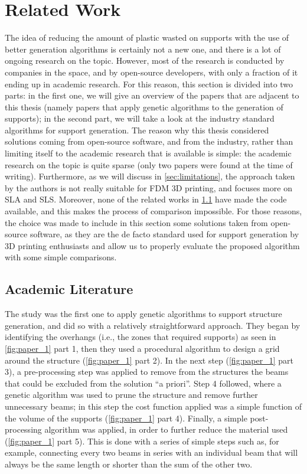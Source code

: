 \chapter{Related Work}
\label{cha:prev_literature}

The idea of reducing the amount of plastic wasted on supports with the use of better
generation algorithms is certainly not a new one, and there is a lot of ongoing
research on the topic. However, most of the research is conducted by companies in
the space, and by open-source developers, with only a fraction of it ending up
in academic research. For this reason, this section is divided into two parts: in the first one, we will give an overview of the papers that are adjacent
to this thesis (namely papers that apply genetic algorithms to the generation
of supports); in the second part, we will take a look at the industry standard
algorithms for support generation.
The reason why this thesis considered solutions coming from open-source software, and
from the industry, rather than limiting itself to the academic research that is available is simple:
the academic research on the topic is quite sparse (only two papers were found at the time of writing).
Furthermore, as we will discuss in \cref{sec:limitations}, the approach taken by the authors is not
really suitable for FDM 3D printing, and focuses more on SLA and SLS. Moreover, none of the related works in \cref{sec:acc_lit}
have made the code available, and this makes the process of comparison impossible.
For those reasons, the choice was made to include in this section some solutions taken from open-source
software, as they are the de facto standard used for support generation by 3D printing enthusiasts and
allow us to properly evaluate the proposed algorithm with some simple comparisons.

\section{Academic Literature}
\label{sec:acc_lit}


The study \cite{VAISSIER201911} was the first one to apply genetic algorithms to support structure generation, and did so with a relatively
straightforward approach. They began by identifying the overhangs (i.e., the zones that required supports)
as seen in \cref{fig:paper_1} part 1, then they used a procedural algorithm to design a grid around the structure
(\cref{fig:paper_1} part 2). In the next step (\cref{fig:paper_1} part 3), a pre-processing step was applied to remove
from the structures the beams that could be excluded from the solution ``a priori''. Step 4 followed, where
a genetic algorithm was used to prune the structure and remove further unnecessary beams; in this step the cost
function applied was a simple function of the volume of the supports (\cref{fig:paper_1} part 4). Finally, a simple
post-processing algorithm was applied, in order to further reduce the material used (\cref{fig:paper_1} part 5).
This is done with a series of simple steps such as, for example, connecting every two beams in series with an individual
beam that will always be the same length or shorter than the sum of the other two.


